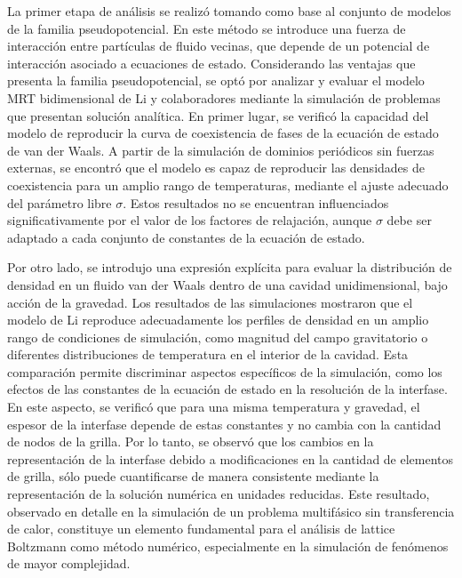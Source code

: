 \bigskip

La primer etapa de an\'alisis se realiz\'o  tomando como base al conjunto de modelos de la familia pseudopotencial. En este m\'etodo se introduce una fuerza de interacci\'on entre part\'iculas de fluido vecinas, que depende de un potencial de interacci\'on asociado a ecuaciones de estado. Considerando las ventajas que presenta la familia pseudopotencial, se opt\'o por analizar y evaluar el modelo MRT bidimensional de Li y colaboradores mediante la simulaci\'on de problemas que presentan soluci\'on anal\'itica. En primer lugar, se verific\'o la capacidad del modelo de reproducir la curva de coexistencia de fases de la ecuaci\'on de estado de van der Waals. A partir de la simulaci\'on de dominios peri\'odicos sin fuerzas externas, se encontr\'o que el modelo es capaz de reproducir las densidades de coexistencia para un amplio rango de temperaturas, mediante el ajuste adecuado del par\'ametro libre $\sigma$. Estos resultados no se encuentran influenciados significativamente por el valor de los factores de relajaci\'on, aunque $\sigma$ debe ser adaptado a cada conjunto de constantes de la ecuaci\'on de estado.

Por otro lado, se introdujo una expresi\'on expl\'icita para evaluar la distribuci\'on de densidad en un fluido van der Waals dentro de una cavidad unidimensional, bajo acci\'on de la gravedad. Los resultados de las simulaciones mostraron que el modelo de Li reproduce adecuadamente los perfiles de densidad en un amplio rango de condiciones de simulaci\'on, como magnitud del campo gravitatorio o diferentes distribuciones de temperatura en el interior de la cavidad. Esta comparaci\'on permite discriminar aspectos espec\'ificos de la simulaci\'on, como los efectos de las constantes de la ecuaci\'on de estado en la resoluci\'on de la interfase. En este aspecto, se verific\'o que para una misma temperatura y gravedad, el espesor de la interfase depende de estas constantes y no cambia con la cantidad de nodos de la grilla. Por lo tanto, se observ\'o que los cambios en la representaci\'on de la interfase debido a modificaciones en la cantidad de elementos de grilla, s\'olo puede cuantificarse de manera consistente mediante la representaci\'on de la soluci\'on num\'erica en unidades reducidas. Este resultado, observado en detalle en la simulaci\'on de un problema multif\'asico sin transferencia de calor, constituye un elemento fundamental para el an\'alisis de lattice Boltzmann como m\'etodo num\'erico, especialmente en la simulaci\'on de fen\'omenos de mayor complejidad.

